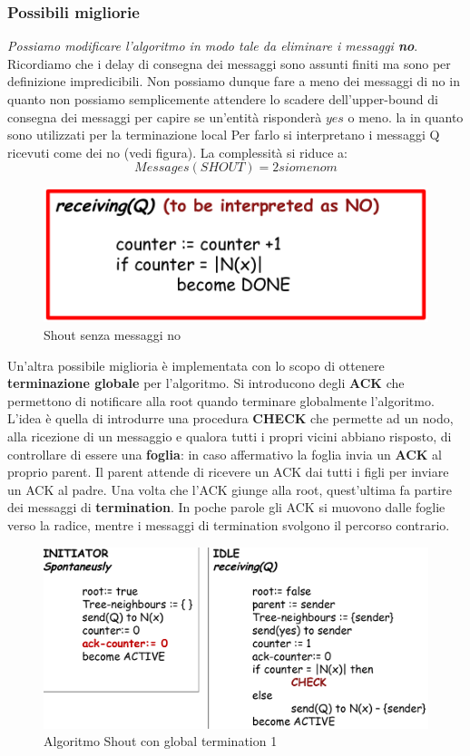 \documentclass[12pt]{article}
\begin{document}
		\subsubsection{Possibili migliorie}
			\textit{Possiamo modificare l'algoritmo in modo tale da eliminare i messaggi \textbf{no}}. Ricordiamo che i delay di consegna dei messaggi sono assunti finiti ma sono per definizione impredicibili. Non possiamo dunque fare a meno dei messaggi di no in quanto non possiamo semplicemente attendere lo scadere  dell'upper-bound di consegna dei messaggi per capire se un'entità risponderà $yes$ o meno. la in quanto sono utilizzati per la terminazione local Per farlo si interpretano i messaggi Q ricevuti come dei no (vedi figura).  La complessità si riduce a:
			$$Messages(SHOUT) = 2si o menom$$
			\begin{figure}[h!]
				\centering
				\includegraphics[scale=0.25]{img/shoutmod.png}
				\caption{Shout senza messaggi no}
			\end{figure}
			Un'altra possibile miglioria è implementata con lo scopo di ottenere \textbf{terminazione globale} per l'algoritmo. Si introducono degli \textbf{ACK} che permettono di notificare alla root quando terminare globalmente l'algoritmo. L'idea è quella di introdurre una procedura \textbf{CHECK} che permette ad un nodo, alla ricezione di un messaggio e qualora tutti i propri vicini abbiano risposto, di controllare di essere una \textbf{foglia}: in caso affermativo la foglia invia un \textbf{ACK} al proprio parent. Il parent attende di ricevere un ACK dai tutti i figli per inviare un ACK al padre. Una volta che l'ACK giunge alla root, quest'ultima fa partire dei messaggi di \textbf{termination}. In poche parole gli ACK si muovono dalle foglie verso la radice, mentre i messaggi di termination svolgono il percorso contrario.
			\begin{figure}[h!]
				\centering
				\includegraphics[scale=0.30]{img/shoutterm.png}
				\caption{Algoritmo Shout con global termination 1}
			\end{figure}
\end{document}
